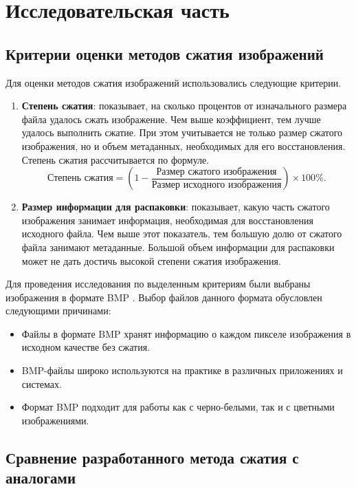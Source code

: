 
\chapter{Исследовательская часть}

\section{Критерии оценки методов сжатия изображений}

Для оценки методов сжатия изображений использовались следующие критерии.
\begin{enumerate}
    \item \textbf{Степень сжатия}: показывает, на сколько процентов от изначального размера файла удалось сжать изображение. Чем выше коэффициент, тем лучше удалось выполнить сжатие. При этом учитывается не только размер сжатого изображения, но и объем метаданных, необходимых для его восстановления. Степень сжатия рассчитывается по формуле.
    \begin{equation}
        \text{Степень сжатия} = \left(1 - \frac{\text{Размер сжатого изображения}}{\text{Размер исходного изображения}}\right) \times 100\%.
    \end{equation}
    \item \textbf{Размер информации для распаковки}: показывает, какую часть сжатого изображения занимает информация, необходимая для восстановления исходного файла. Чем выше этот показатель, тем большую долю от сжатого файла занимают метаданные. Большой объем информации для распаковки может не дать достичь высокой степени сжатия изображения.
\end{enumerate}

Для проведения исследования по выделенным критериям были выбраны изображения в формате BMP \cite{article-bmp}. Выбор файлов данного формата обусловлен следующими причинами:
\begin{itemize}
    \item Файлы в формате BMP хранят информацию о каждом пикселе изображения в исходном качестве без сжатия.
    \item BMP-файлы широко используются на практике в различных приложениях и системах.
    \item Формат BMP подходит для работы как с черно-белыми, так и с цветными изображениями.
\end{itemize}

\section{Сравнение разработанного метода сжатия с аналогами}

